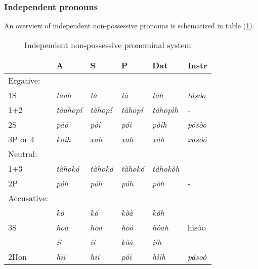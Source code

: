 \documentclass[a4paper, 12pt, oneside]{memoir}
\begin{document}
\subsubsection{Independent pronouns}
An overview of independent non-possessive pronouns is schematized in table (\ref{t:indeppron}).
\begin{table}[H]
\begin{centering}
    \begin{tabular}{@{}llllll@{}}
    \toprule
    \multicolumn{1}{c}{} & A                    & S                    & P                    & Dat              & Instr                  \\ \midrule
    Ergative:            & \multicolumn{1}{c}{} & \multicolumn{1}{c}{} & \multicolumn{1}{c}{} &                  & \multicolumn{1}{c}{}   \\
    1S                   & \textit{tàah}        & \textit{tà}          & \textit{tà}          & \textit{tàh}     & \textit{tàsóo}         \\
    1+2                  & \textit{tàahopí}     & \textit{tàhopí}      & \textit{tàhopí}      & \textit{tàhopìh} & \textit{-}             \\
    2S                   & \textit{páó}         & \textit{pói}         & \textit{pói}         & \textit{pòih}    & \textit{pósòo}         \\
    3P or 4              & \textit{koìh}        & \textit{xah}         & \textit{xah}         & \textit{xàh}     & \textit{xasóó}         \\
    Neutral:             &                      &                      &                      &                  &                        \\
    1+3                  & \textit{tàhokó}      & \textit{tàhokó}      & \textit{tàhokó}      & \textit{tàhokòh} & -                      \\
    2P                   & \textit{póh}         & \textit{póh}         & \textit{póh}         & \textit{pòh}     & -                      \\
    Accusative:          &                      &                      &                      &                  &                        \\
                         & \textit{kó}          & \textit{kó}          & \textit{kòà}         & \textit{kòh}     &                        \\
                      3S & \textit{hoa}         & \textit{hoa}         & \textit{hoó}         & \textit{hòah}    & hisóo                  \\
                         & \textit{íí}          & \textit{íí}          & \textit{kòà}         & \textit{ìih}     &                        \\
    2Hon                 & \textit{hií}         & \textit{hií}         & \textit{pói}         & \textit{hìih}    & \textit{pásoò}         \\ \bottomrule
    \end{tabular}
    \caption{Independent non-possessive pronominal system
    }
    \label{t:indeppron}
\end{centering}
\end{table}
\end{document}
